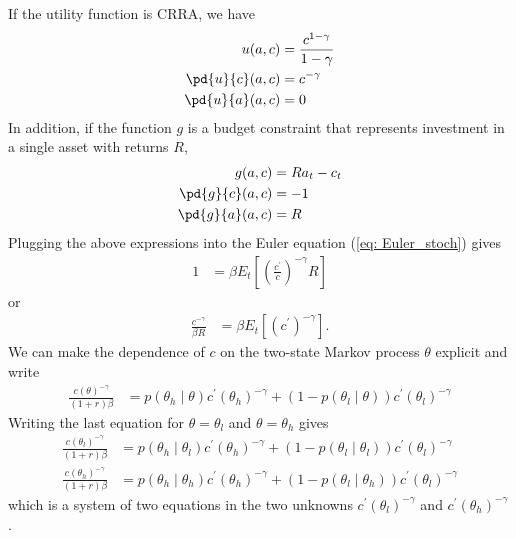 \documentclass[\topdir/lecture\_notes.tex]{subfiles}
\begin{document}
\begin{example}
    If the utility function is CRRA, we have
    \begin{align*}
        u(a,c)&=\frac{c^{1-\gamma}}{1-\gamma} \\
        \pd{u}{c}(a,c)&=c^{-\gamma} \\
        \pd{u}{a}(a,c)&=0
    \end{align*}
    In addition, if the function $g$ is a budget constraint that represents investment in a single asset with returns $R$,
     \begin{align*}
        g(a,c)&=R a_t - c_t \\
        \pd{g}{c}(a,c)&= -1  \\
        \pd{g}{a}(a,c)&=R
    \end{align*}
    Plugging the above expressions into the Euler equation (\ref{eq: Euler_stoch}) gives
    \begin{align*}
        1&=\beta E_{t}\left[\left(\frac{c^{\prime}}{c}\right)^{-\gamma}R\right]
    \end{align*}
    or
    \begin{align*}
        \frac{c^{-\gamma}}{\beta R}&=\beta E_{t}\left[\left(c^{\prime}\right)^{-\gamma}\right].
    \end{align*}
    We can make the dependence of $c$ on the two-state Markov process $\theta$ explicit and write
    \begin{align*}
        \frac{c(\theta)^{-\gamma}}{(1+r)\beta}&=p(\theta_{h}\mid\theta)c^{\prime}(\theta_{h})^{-\gamma}+(1-p(\theta_{l}\mid\theta))c^{\prime}(\theta_{l})^{-\gamma}
    \end{align*}
    Writing the last equation for $\theta=\theta_l$ and $\theta=\theta_h$ gives
    \begin{align*}
    \frac{c(\theta_{l})^{-\gamma}}{(1+r)\beta}&=p(\theta_{h}\mid\theta_{l})c^{\prime}(\theta_{h})^{-\gamma}+(1-p(\theta_{l}\mid\theta_{l}))c^{\prime}(\theta_{l})^{-\gamma}\\
    \frac{c(\theta_{h})^{-\gamma}}{(1+r)\beta}&=p(\theta_{h}\mid\theta_{h})c^{\prime}(\theta_{h})^{-\gamma}+(1-p(\theta_{l}\mid\theta_{h}))c^{\prime}(\theta_{l})^{-\gamma}
    \end{align*}
    which is a system of two equations in the two unknowns $c^{\prime}(\theta_{l})^{-\gamma}$ and $c^{\prime}(\theta_{h})^{-\gamma}$.
\end{example}
\end{document}
